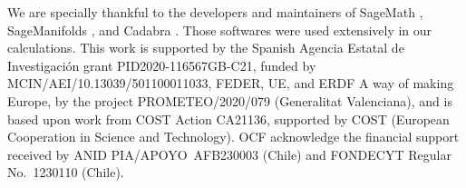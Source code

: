 \documentclass[epj]{svjour}
\begin{document}
We are specially thankful to the developers and maintainers of SageMath \cite{sagemath}, SageManifolds \cite{Gourgoulhon_2015,Gourgoulhon_2018}, and Cadabra \cite{peeters2018introducing,Peeters2018,Peeters_2007}. Those softwares were used extensively in our calculations. This work is supported by the Spanish Agencia Estatal de Investigaci\'on grant PID2020-116567GB-C21, funded by MCIN/AEI/10.13039/501100011033, FEDER, UE, and ERDF A way of making Europe, by the project PROMETEO/2020/079 (Generalitat Valenciana), and is based upon work from COST Action CA21136, supported by COST (European Cooperation in Science and Technology). OCF acknowledge the financial support received by ANID PIA/APOYO~AFB230003 (Chile) and FONDECYT Regular No.~1230110 (Chile).



\end{document}
